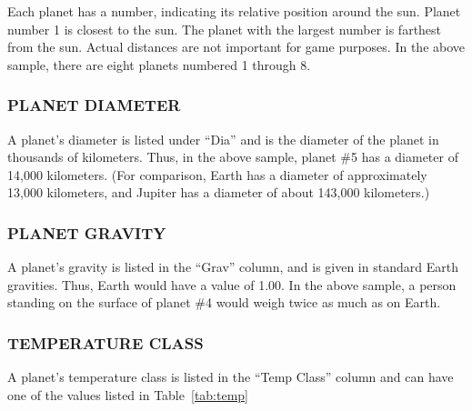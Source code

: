 \documentclass[10pt,titlepage]{article}
\begin{document}
Each planet has a number, indicating its relative position around the sun.
Planet number 1 is closest to the sun.  The planet with the largest number is
farthest from the sun.  Actual distances are not important for game purposes.
In the above sample, there are eight planets numbered 1 through 8.


\subsubsection{PLANET DIAMETER}

A planet's diameter is listed under ``Dia'' and is the diameter of the planet in
thousands of kilometers.  Thus, in the above sample, planet \#5 has a diameter
of 14,000 kilometers.  (For comparison, Earth has a diameter of approximately
13,000 kilometers, and Jupiter has a diameter of about 143,000 kilometers.)


\subsubsection{PLANET GRAVITY}

A planet's gravity is listed in the ``Grav'' column, and is given in standard
Earth gravities.  Thus, Earth would have a value of 1.00.  In the above sample,
a person standing on the surface of planet \#4 would weigh twice as much as on
Earth.


\subsubsection{TEMPERATURE CLASS}

A planet's temperature class is listed in the ``Temp Class'' column and can have
one of the values listed in Table~\ref{tab:temp}
\end{document}
